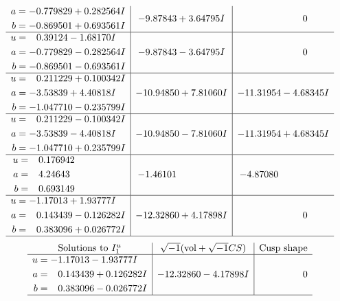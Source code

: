 \documentclass[1p]{elsarticle_modified}
\theoremstyle{definition}
\newcommand{\I}{\sqrt{-1}}
\begin{document}
$$\begin{array}{c|c|c}
\begin{aligned}
a &= -0.779829 + 0.282564 I \\
b &= -0.869501 + 0.693561 I\end{aligned}
 & -9.87843 + 3.64795 I & \phantom{-0.000000 } 0 \\ \hline\begin{aligned}
u &= \phantom{-}0.39124 - 1.68170 I \\
a &= -0.779829 - 0.282564 I \\
b &= -0.869501 - 0.693561 I\end{aligned}
 & -9.87843 - 3.64795 I & \phantom{-0.000000 } 0 \\ \hline\begin{aligned}
u &= \phantom{-}0.211229 + 0.100342 I \\
a &= -3.53839 + 4.40818 I \\
b &= -1.047710 - 0.235799 I\end{aligned}
 & -10.94850 + 7.81060 I & -11.31954 - 4.68345 I \\ \hline\begin{aligned}
u &= \phantom{-}0.211229 - 0.100342 I \\
a &= -3.53839 - 4.40818 I \\
b &= -1.047710 + 0.235799 I\end{aligned}
 & -10.94850 - 7.81060 I & -11.31954 + 4.68345 I \\ \hline\begin{aligned}
u &= \phantom{-}0.176942\phantom{ +0.000000I} \\
a &= \phantom{-}4.24643\phantom{ +0.000000I} \\
b &= \phantom{-}0.693149\phantom{ +0.000000I}\end{aligned}
 & -1.46101\phantom{ +0.000000I} & -4.87080\phantom{ +0.000000I} \\ \hline\begin{aligned}
u &= -1.17013 + 1.93777 I \\
a &= \phantom{-}0.143439 - 0.126282 I \\
b &= \phantom{-}0.383096 + 0.026772 I\end{aligned}
 & -12.32860 + 4.17898 I & \phantom{-0.000000 } 0\\
 \hline 
 \end{array}$$\newpage$$\begin{array}{c|c|c}  
\text{Solutions to }I^u_{1}& \I (\text{vol} + \sqrt{-1}CS) & \text{Cusp shape}\\
 \hline 
\begin{aligned}
u &= -1.17013 - 1.93777 I \\
a &= \phantom{-}0.143439 + 0.126282 I \\
b &= \phantom{-}0.383096 - 0.026772 I\end{aligned}
 & -12.32860 - 4.17898 I & \phantom{-0.000000 } 0\\
 \hline 
 \end{array}$$\newpage\newpage\renewcommand{\arraystretch}{1}
\end{document}
